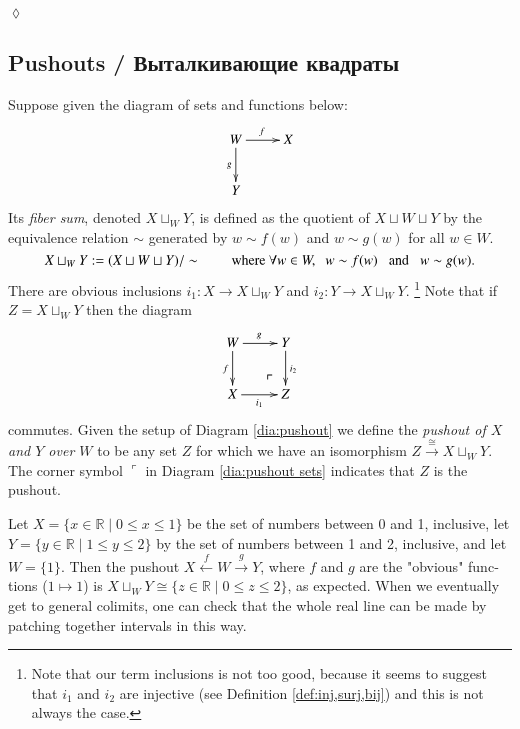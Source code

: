 \documentclass{book}
\makeatletter
\def\tn{\textnormal}
\def\RR{{\mathbb R}}
\def\hsp{\hspace{.3in}}
\def\to{\rightarrow}
\def\taking{\colon}
\def\iso{\cong}
\def\|{{\;|\;}}
\def\lrlimit{\ar@{}[lu]|(.3)*+{\ulcorner}}
\newcommand{\To}[1]{\xrightarrow{#1}}
\newcommand{\From}[1]{\xleftarrow{#1}}
\theoremstyle{theoremENG}
\theoremstyle{lemmaENG}
\theoremstyle{propositionENG}
\theoremstyle{corollaryENG}
\theoremstyle{factENG}
\theoremstyle{remarkENG}
\theoremstyle{exampleENG}
\newtheorem{exampleENG}[subsubsection]{\begin{english}Example\end{english}}
\theoremstyle{warningENG}
\theoremstyle{questionENG}
\theoremstyle{guessENG}
\theoremstyle{answerENG}
\theoremstyle{constructionENG}
\theoremstyle{rulesENG}
\theoremstyle{excENG}
\newtheorem{excENG}[subsubsection]{\begin{english}Exercise\end{english}}
\theoremstyle{appENG}
\theoremstyle{definitionENG}
\newtheorem{definitionENG}[subsubsection]{\begin{english}Definition\end{english}}
\theoremstyle{notationENG}
\theoremstyle{conjectureENG}
\theoremstyle{postulateENG}
\newenvironment{exerciseENG}{\begin{excENG}}{\hspace*{\fill}$\lozenge$\end{excENG}}
\theoremstyle{theoremRUS}
\theoremstyle{lemmaRUS}
\theoremstyle{propositionRUS}
\theoremstyle{corollaryRUS}
\theoremstyle{factRUS}
\theoremstyle{remarkRUS}
\theoremstyle{exampleRUS}
\theoremstyle{warningRUS}
\theoremstyle{questionRUS}
\theoremstyle{guessRUS}
\theoremstyle{answerRUS}
\theoremstyle{constructionRUS}
\theoremstyle{rulesRUS}
\theoremstyle{excRUS}
\theoremstyle{appRUS}
\theoremstyle{definitionRUS}
\theoremstyle{notationRUS}
\theoremstyle{conjectureRUS}
\theoremstyle{postulateRUS}
\makeatother
\begin{document}
\begin{english}
\begin{exerciseENG}
\begin{russian} \end{russian}

\end{exerciseENG}


\subsection{Pushouts / Выталкивающие квадраты}\label{sec:pushouts}

\begin{definitionENG}[Pushout]\label{def:pushout}

Suppose given the diagram of sets and functions below:
\begin{align}\label{dia:pushout}
\xymatrix{W\ar[r]^f\ar[d]_g&X\\Y}
\end{align}
Its {\em fiber sum}, denoted $X\sqcup_WY$, is defined as the quotient of $X\sqcup W\sqcup Y$ by the equivalence relation $\sim$ generated by $w\sim f(w)$ and $w\sim g(w)$ for all $w\in W$.
$$X\sqcup_WY:=(X\sqcup W\sqcup Y)/\sim \hsp\tn{where } \forall w\in W,\;\;  w\sim f(w)\;\;\tn{ and }\;\; w\sim g(w).$$ 
There are obvious inclusions $i_1\taking X\to X\sqcup_WY$ and $i_2\taking Y\to X\sqcup_WY$.
\footnote{Note that our term inclusions is not too good, because it seems to suggest that $i_1$ and $i_2$ are injective (see Definition \ref{def:inj,surj,bij}) and this is not always the case.}
Note that if $Z=X\sqcup_WY$ then the diagram
\begin{align}\label{dia:pushout sets}
\xymatrix{W\ar[r]^g\ar[d]_f&Y\ar[d]^{i_2}\\X\ar[r]_-{i_1}&Z\lrlimit}
\end{align} 
commutes. Given the setup of Diagram \ref{dia:pushout} we define the {\em pushout of $X$ and $Y$ over $W$} to be any set $Z$ for which we have an isomorphism $Z\To{\iso}X\sqcup_WY$. The corner symbol $\ulcorner$ in Diagram \ref{dia:pushout sets} indicates that $Z$ is the pushout.

\begin{russian} \end{russian}

\end{definitionENG}

\begin{exampleENG}

Let $X=\{x\in\RR\|0\leq x\leq1\}$ be the set of numbers between 0 and 1, inclusive, let $Y=\{y\in\RR\|1\leq y\leq 2\}$ by the set of numbers between 1 and 2, inclusive, and let $W=\{1\}$. Then the pushout $X\From{f} W\To{g} Y$, where $f$ and $g$ are the "obvious" functions ($1\mapsto 1$) is $X\sqcup_WY\iso\{z\in\RR\|0\leq z\leq 2\}$, as expected. When we eventually get to general colimits, one can check that the whole real line can be made by patching together intervals in this way.


\end{exampleENG}
\end{english}
\end{document}
